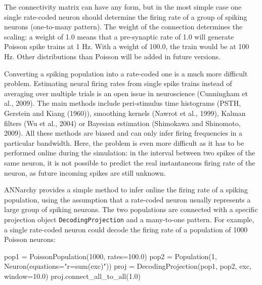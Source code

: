 \documentclass[
  11pt,
  a4paper,
]{scrbook}
\newenvironment{Shaded}{}{}
\newcommand{\DecValTok}[1]{\textcolor[rgb]{0.00,0.36,0.77}{#1}}
\newcommand{\FloatTok}[1]{\textcolor[rgb]{0.00,0.36,0.77}{#1}}
\newcommand{\NormalTok}[1]{\textcolor[rgb]{0.14,0.16,0.18}{#1}}
\newcommand{\OperatorTok}[1]{\textcolor[rgb]{0.14,0.16,0.18}{#1}}
\newcommand{\StringTok}[1]{\textcolor[rgb]{0.01,0.18,0.38}{#1}}
\begin{document}
The connectivity matrix can have any form, but in the most simple case
one single rate-coded neuron should determine the firing rate of a group
of spiking neurons (one-to-many pattern). The weight of the connection
determines the scaling: a weight of 1.0 means that a pre-synaptic rate
of 1.0 will generate Poisson spike trains at 1 Hz. With a weight of
100.0, the train would be at 100 Hz. Other distributions than Poisson
will be added in future versions.

Converting a spiking population into a rate-coded one is a much more
difficult problem. Estimating neural firing rates from single spike
trains instead of averaging over multiple trials is an open issue in
neuroscience (Cunningham et al., 2009). The main methods include
peri-stimulus time histograms (PSTH, Gerstein and Kiang (1960)),
smoothing kernels (Nawrot et al., 1999), Kalman filters (Wu et al.,
2004) or Bayesian estimation (Shimokawa and Shinomoto, 2009). All these
methods are biased and can only infer firing frequencies in a particular
bandwidth. Here, the problem is even more difficult as it has to be
performed online during the simulation: in the interval between two
spikes of the same neuron, it is not possible to predict the real
instantaneous firing rate of the neuron, as future incoming spikes are
still unknown.

ANNarchy provides a simple method to infer online the firing rate of a
spiking population, using the assumption that a rate-coded neuron
usually represents a large group of spiking neurons. The two populations
are connected with a specific projection object
\texttt{DecodingProjection} and a many-to-one pattern. For example, a
single rate-coded neuron could decode the firing rate of a population of
1000 Poisson neurons:

\begin{Shaded}
\begin{Highlighting}[]
\NormalTok{pop1 }\OperatorTok{=}\NormalTok{ PoissonPopulation(}\DecValTok{1000}\NormalTok{, rates}\OperatorTok{=}\FloatTok{100.0}\NormalTok{)}
\NormalTok{pop2 }\OperatorTok{=}\NormalTok{ Population(}\DecValTok{1}\NormalTok{, Neuron(equations}\OperatorTok{=}\StringTok{"r=sum(exc)"}\NormalTok{))}
\NormalTok{proj }\OperatorTok{=}\NormalTok{ DecodingProjection(pop1, pop2, }\StringTok{\textquotesingle{}exc\textquotesingle{}}\NormalTok{, window}\OperatorTok{=}\FloatTok{10.0}\NormalTok{)}
\NormalTok{proj.connect\_all\_to\_all(}\FloatTok{1.0}\NormalTok{)}
\end{Highlighting}
\end{Shaded}
\end{document}
